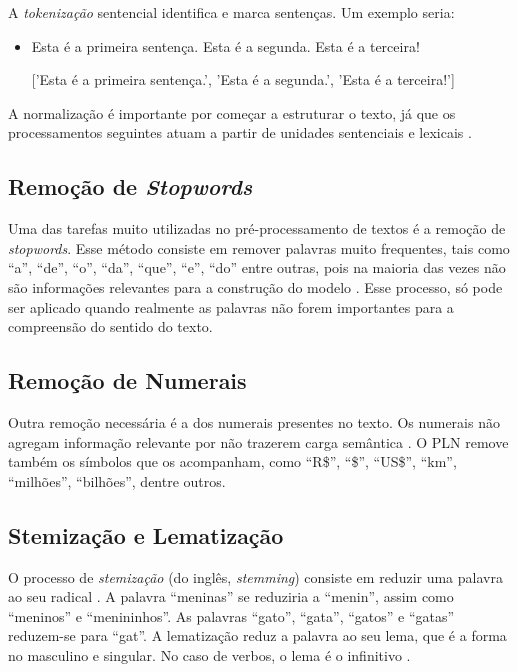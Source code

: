 A \textit{tokenização} sentencial identifica e marca sentenças. Um exemplo seria:
\begin{itemize}
	\item Esta é a primeira sentença. Esta é a segunda. Esta é a terceira!
	\item[] ['Esta é a primeira sentença.', 'Esta é a segunda.', 'Esta é a terceira!']
\end{itemize}

A normalização é importante por começar a estruturar o texto, já que os processamentos seguintes atuam a partir de unidades sentenciais e lexicais \cite{pinho2021analise}.

\subsection{Remoção de \textit{Stopwords}}
\label{sec:remocao-stopwords}
Uma das tarefas muito utilizadas no pré-processamento de textos é a remoção de \textit{stopwords}. Esse 
método consiste em remover palavras muito frequentes, tais como “a”, “de”, “o”, “da”, “que”, “e”, “do” 
entre outras, pois na maioria das vezes não são informações relevantes para a construção do modelo 
\cite{dos2021analise}. 
Esse processo, só pode ser aplicado quando realmente as palavras não forem importantes para a compreensão do 
sentido do texto.

\subsection{Remoção de Numerais}
\label{sec:remocao-numerais}
Outra remoção necessária é a dos numerais presentes no texto. Os numerais não agregam informação relevante 
por não trazerem carga semântica \cite{jurafskymartin2020}. O PLN remove também os símbolos que os 
acompanham, como “R\$”, “\$”, “US\$”, “km”, “milhões”, “bilhões”, dentre outros.

\subsection{Stemização e Lematização}
\label{sec:stemizacao-lematizacao}
O processo de \textit{stemização} (do inglês, \textit{stemming}) consiste em reduzir uma palavra ao seu 
radical \cite{gobbo2019abordagem}. A palavra “meninas” se reduziria a “menin”, assim como “meninos” e 
“menininhos”. As palavras “gato”, “gata”, “gatos” e “gatas” reduzem-se para “gat”. A lematização reduz a 
palavra ao seu lema, que é a forma no masculino e singular. No caso de verbos, o lema é o infinitivo 
\cite{campos2021uso}.

